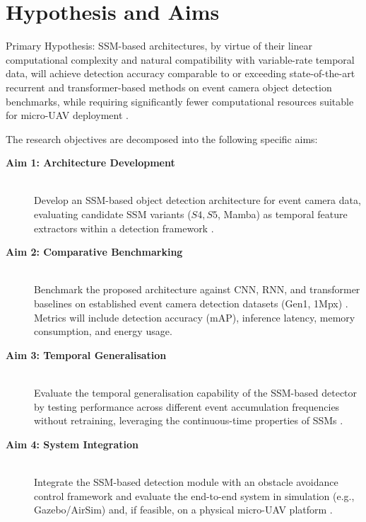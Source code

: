 \documentclass[11pt, a4paper]{report}
\begin{document}
\section{Hypothesis and Aims}
Primary Hypothesis: SSM-based architectures, by virtue of their linear computational complexity and natural compatibility with variable-rate temporal data, will achieve detection accuracy comparable to or exceeding state-of-the-art recurrent and transformer-based methods on event camera object detection benchmarks, while requiring significantly fewer computational resources suitable for micro-UAV deployment \cite{gu2023mamba, zubic2024state}.

The research objectives are decomposed into the following specific aims:

\begin{description}
    \item[\textbf{Aim 1: Architecture Development}] \hfill \\
    Develop an SSM-based object detection architecture for event camera data, evaluating candidate SSM variants ($S4, S5$, Mamba) as temporal feature extractors within a detection framework \cite{gu2022efficiently, smith2023simplified, gu2023mamba}.
    
    \item[\textbf{Aim 2: Comparative Benchmarking}] \hfill \\
    Benchmark the proposed architecture against CNN, RNN, and transformer baselines on established event camera detection datasets (Gen1, 1Mpx) \cite{perot2020learning}. Metrics will include detection accuracy (mAP), inference latency, memory consumption, and energy usage.
    
    \item[\textbf{Aim 3: Temporal Generalisation}] \hfill \\
    Evaluate the temporal generalisation capability of the SSM-based detector by testing performance across different event accumulation frequencies without retraining, leveraging the continuous-time properties of SSMs \cite{zubic2024state}.
    
    \item[\textbf{Aim 4: System Integration}] \hfill \\
    Integrate the SSM-based detection module with an obstacle avoidance control framework and evaluate the end-to-end system in simulation (e.g., Gazebo/AirSim) and, if feasible, on a physical micro-UAV platform \cite{falanga2019fast, sanket2020evdodgenet}.
\end{description}
\end{document}
